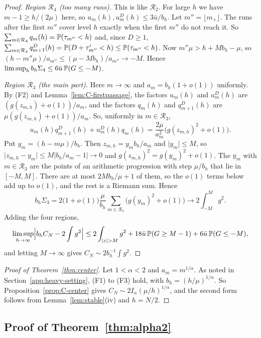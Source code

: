 \begin{proof}
\emph{Region $\mathcal R_4$ (too many runs).} This is like $\mathcal R_2$. For large $h$
we have $m-1\ge h/(2\mu)$ here, so $u_m(h),u^D_m(h)\le3\bar u/b_h$. Let
$m''=\lfloor m_+\rfloor$. The runs after the first $m''$ cover level $h$ exactly when
the first $m''$ do not reach it. So $\sum_{m\in\mathcal R_4}q_m(h)=\mathbb{P}(\tau_{m''}<h)$
and, since $D\ge1$,
$\sum_{m\in\mathcal R_4}q^D_{m+1}(h)=\mathbb{P}(D+\tau'_{m''}<h)\le\mathbb{P}(\tau_{m''}<h)$. Now
$m''\mu>h+Mb_h-\mu$, so $(h-m''\mu)/a_{m''}\le(\mu-Mb_h)/a_{m''}\to-M$. Hence
$\limsup_hb_h\Sigma_4\le6\bar u\,\mathbb{P}(G\le-M)$.

\emph{Region $\mathcal R_3$ (the main part).} Here $m\to\infty$ and
$a_m=b_h(1+o(1))$ uniformly. By (F2) and Lemma~\ref{lem:C-firstpassage}, the factors
$u_m(h)$ and $u^D_m(h)$ are $(g(z_{m,h})+o(1))/a_m$, and the factors $q_m(h)$ and
$q^D_{m+1}(h)$ are $\mu(g(z_{m,h})+o(1))/a_m$. So, uniformly in $m\in\mathcal R_3$,
\[
u_m(h)q^D_{m+1}(h)+u^D_m(h)q_m(h)=\frac{2\mu}{a_m^2}\bigl(g(z_{m,h})^2+o(1)\bigr).
\]
Put $y_m=(h-m\mu)/b_h$. Then $z_{m,h}=y_mb_h/a_m$ and $\lvert y_m\rvert\le M$, so
$\lvert z_{m,h}-y_m\rvert\le M\lvert b_h/a_m-1\rvert\to0$ and
$g(z_{m,h})^2=g(y_m)^2+o(1)$. The $y_m$ with $m\in\mathcal R_3$ are the points of an
arithmetic progression with step $\mu/b_h$ that lie in $[-M,M]$. There are at most
$2Mb_h/\mu+1$ of them, so the $o(1)$ terms below add up to $o(1)$, and the rest is a
Riemann sum. Hence
\[
b_h\Sigma_3=2\bigl(1+o(1)\bigr)\frac\mu{b_h}
\sum_{m\in\mathcal R_3}\bigl(g(y_m)^2+o(1)\bigr)\to2\int_{-M}^Mg^2 .
\]
Adding the four regions,
\[
\limsup_{h\to\infty}\Bigl\lvert b_hC_N-2\int g^2\Bigr\rvert
\le2\int_{\lvert z\rvert>M}g^2+18\bar u\,\mathbb{P}(G\ge M-1)+6\bar u\,\mathbb{P}(G\le-M),
\]
and letting $M\to\infty$ gives $C_N\sim2b_h^{-1}\int g^2$.
\end{proof}

\begin{proof}[Proof of Theorem~\ref{thm:center}]
Let $1<\alpha<2$ and $a_m=m^{1/\alpha}$. As noted in
Section~\ref{app:heavy-setting}, (F1) to (F3) hold, with $b_h=(h/\mu)^{1/\alpha}$. So
Proposition~\ref{prop:C-center} gives $C_N\sim2I_\alpha(\mu/h)^{1/\alpha}$, and the
second form follows from Lemma~\ref{lem:stable}(iv) and $h=N/2$.
\end{proof}

\subsection{Proof of Theorem~\ref{thm:alpha2}}\label{app:heavy-alpha2}


